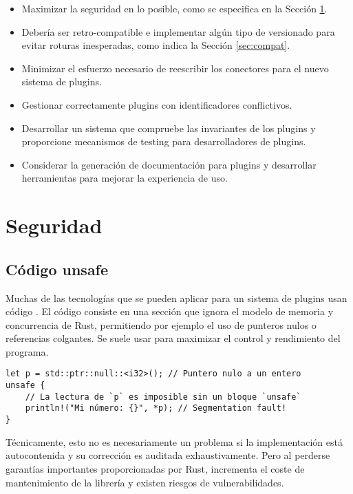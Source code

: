 \begin{itemize}
    \item Maximizar la seguridad en lo posible, como se especifica en la Sección
        \ref{sec:security}.

    \item Debería ser retro-compatible e implementar algún tipo de versionado
        para evitar roturas inesperadas, como indica la Sección
        \ref{sec:compat}.

    \item Minimizar el esfuerzo necesario de reescribir los conectores para el
        nuevo sistema de plugins.

    \item Gestionar correctamente plugins con identificadores conflictivos.

    \item Desarrollar un sistema que compruebe las invariantes de los plugins y
        proporcione mecanismos de testing para desarrolladores de plugins.

    \item Considerar la generación de documentación para plugins y desarrollar
        herramientas para mejorar la experiencia de uso.

\end{itemize}

\section{Seguridad}\label{sec:security}

\subsection{Código unsafe}

Muchas de las tecnologías que se pueden aplicar para un sistema de plugins usan
código \unsafe. El código \unsafe consiste en una sección que ignora el modelo
de memoria y concurrencia de Rust, permitiendo por ejemplo el uso de punteros
nulos o referencias colgantes. Se suele usar para maximizar el control y
rendimiento del programa.

\begin{verbatim}
let p = std::ptr::null::<i32>(); // Puntero nulo a un entero
unsafe {
    // La lectura de `p` es imposible sin un bloque `unsafe`
    println!("Mi número: {}", *p); // Segmentation fault!
}
\end{verbatim}

Técnicamente, esto no es necesariamente un problema si la implementación está
autocontenida y su corrección es auditada exhaustivamente. Pero al perderse
garantías importantes proporcionadas por Rust, incrementa el coste de
mantenimiento de la librería y existen riesgos de vulnerabilidades.

